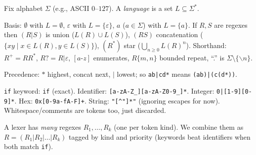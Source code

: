 Fix alphabet $\Sigma$ (e.g., ASCII $0$--$127$). A \emph{language} is a set $L\subseteq\Sigma^*$.
\begin{definition}
Basis: $\emptyset$ with $L=\emptyset$, $\varepsilon$ with $L=\{\varepsilon\}$, $a$ ($a\in\Sigma$) with $L=\{a\}$. If $R,S$ are regexes then $(R|S)$ is union ($L(R)\cup L(S)$), $(RS)$ concatenation ($\{xy\mid x\in L(R),y\in L(S)\}$), $(R^*)$ star ($\bigcup_{n\ge0}L(R)^n$). Shorthand: $R^+=RR^*$, $R?=R|\varepsilon$, $[a\text{-}z]$ enumerates, $R\{m,n\}$ bounded repeat, ``.'' is $\Sigma\setminus\{\backslash n\}$.
\end{definition}
Precedence: $*$ highest, concat next, $|$ lowest; so \texttt{ab|cd*} means \texttt{(ab)|(c(d*))}.

\begin{example}
\texttt{if} keyword: \texttt{if} (exact). Identifier: \texttt{[a-zA-Z\_][a-zA-Z0-9\_]*}. Integer: \texttt{0|[1-9][0-9]*}. Hex: \texttt{0x[0-9a-fA-F]+}. String: \texttt{"[{\string^}"]*"} (ignoring escapes for now). Whitespace/comments are tokens too, just discarded.
\end{example}

A lexer has \emph{many} regexes $R_1,\dots,R_k$ (one per token kind). We combine them as $R = (R_1|R_2|\dots|R_k)$ tagged by kind and priority (keywords beat identifiers when both match \texttt{if}).

